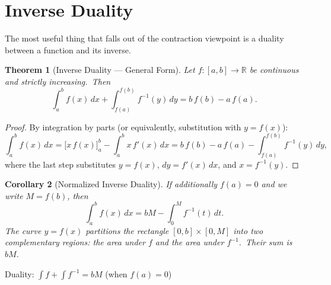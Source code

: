 \documentclass[11pt,a4paper]{article}
\newtheorem{theorem}{Theorem}[section]
\newtheorem{corollary}[theorem]{Corollary}
\begin{document}
\section{Inverse Duality}

The most useful thing that falls out of the contraction viewpoint is a duality between a function and its inverse.

\begin{theorem}[Inverse Duality --- General Form]\label{thm:duality}
Let $f:[a,b]\to\mathbb{R}$ be continuous and strictly increasing.\ Then
\[
\int_a^b f(x)\,dx + \int_{f(a)}^{f(b)} f^{-1}(y)\,dy = b\,f(b) - a\,f(a).
\]
\end{theorem}

\begin{proof}
By integration by parts (or equivalently, substitution with $y=f(x)$):
\[
\int_a^b f(x)\,dx = \bigl[x\,f(x)\bigr]_a^b - \int_a^b x\,f'(x)\,dx
= b\,f(b) - a\,f(a) - \int_{f(a)}^{f(b)} f^{-1}(y)\,dy,
\]
where the last step substitutes $y=f(x)$, $dy=f'(x)\,dx$, and $x=f^{-1}(y)$.
\end{proof}

\begin{corollary}[Normalized Inverse Duality]\label{cor:norm-duality}
If additionally $f(a)=0$ and we write $M=f(b)$, then
\[
\int_a^b f(x)\,dx = bM - \int_0^M f^{-1}(t)\,dt.
\]
The curve $y=f(x)$ partitions the rectangle $[0,b]\times[0,M]$ into two complementary regions: the area under $f$ and the area under $f^{-1}$.\ Their sum is $bM$.
\end{corollary}

\begin{center}

\smallskip
Duality: $\int\! f + \int\! f^{-1} = bM$ (when $f(a)=0$)
\end{center}
\end{document}
